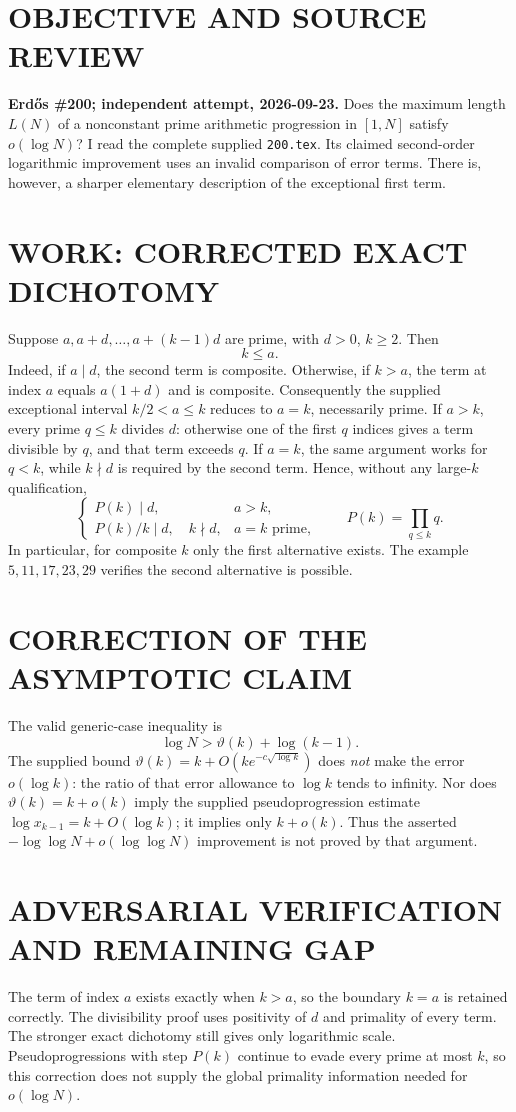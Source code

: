 \section{OBJECTIVE AND SOURCE REVIEW}
\textbf{Erd\H{o}s \#200; independent attempt, 2026-09-23.}
Does the maximum length $L(N)$ of a nonconstant prime arithmetic progression in $[1,N]$ satisfy $o(\log N)$? I read the complete supplied \texttt{200.tex}. Its claimed second-order logarithmic improvement uses an invalid comparison of error terms. There is, however, a sharper elementary description of the exceptional first term.
\section{WORK: CORRECTED EXACT DICHOTOMY}
Suppose $a,a+d,\ldots,a+(k-1)d$ are prime, with $d>0$, $k\ge2$. Then
\[
k\le a.
\]
Indeed, if $a\mid d$, the second term is composite. Otherwise, if $k>a$, the term at index $a$ equals $a(1+d)$ and is composite. Consequently the supplied exceptional interval $k/2<a\le k$ reduces to $a=k$, necessarily prime.
If $a>k$, every prime $q\le k$ divides $d$: otherwise one of the first $q$ indices gives a term divisible by $q$, and that term exceeds $q$. If $a=k$, the same argument works for $q<k$, while $k\nmid d$ is required by the second term. Hence, without any large-$k$ qualification,
\[
\begin{cases}
P(k)\mid d,&a>k,\\
P(k)/k\mid d,\quad k\nmid d,&a=k\text{ prime},
\end{cases}
\qquad P(k)=\prod_{q\le k}q.
\]
In particular, for composite $k$ only the first alternative exists. The example $5,11,17,23,29$ verifies the second alternative is possible.
\section{CORRECTION OF THE ASYMPTOTIC CLAIM}
The valid generic-case inequality is
\[
\log N>\vartheta(k)+\log(k-1).
\]
The supplied bound $\vartheta(k)=k+O(ke^{-c\sqrt{\log k}})$ does \emph{not} make the error $o(\log k)$: the ratio of that error allowance to $\log k$ tends to infinity. Nor does $\vartheta(k)=k+o(k)$ imply the supplied pseudoprogression estimate $\log x_{k-1}=k+O(\log k)$; it implies only $k+o(k)$. Thus the asserted $-\log\log N+o(\log\log N)$ improvement is not proved by that argument.
\section{ADVERSARIAL VERIFICATION AND REMAINING GAP}
The term of index $a$ exists exactly when $k>a$, so the boundary $k=a$ is retained correctly. The divisibility proof uses positivity of $d$ and primality of every term. The stronger exact dichotomy still gives only logarithmic scale. Pseudoprogressions with step $P(k)$ continue to evade every prime at most $k$, so this correction does not supply the global primality information needed for $o(\log N)$.
